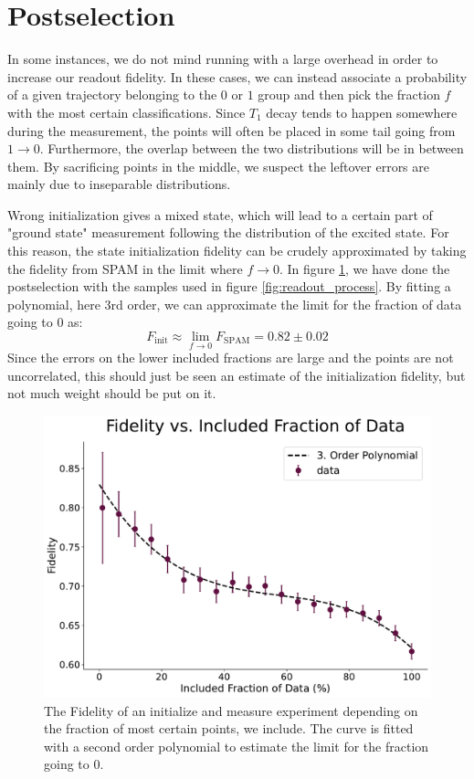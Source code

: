 \section{Postselection}\label{sec:postselection}
In some instances, we do not mind running with a large overhead in order to increase our readout fidelity. In these cases, we can instead associate a probability of a given trajectory belonging to the $0$ or $1$ group and then pick the fraction $f$ with the most certain classifications. Since $T_1$ decay tends to happen somewhere during the measurement, the points will often be placed in some tail going from $1 \to 0$. Furthermore, the overlap between the two distributions will be in between them. By sacrificing points in the middle, we suspect the leftover errors are mainly due to inseparable distributions. 

Wrong initialization gives a mixed state, which will lead to a certain part of "ground state" measurement following the distribution of the excited state. For this reason, the state initialization fidelity can be crudely approximated by taking the fidelity from SPAM in the limit where $f\to 0$. In figure \ref{fig:postselection_plot}, we have done the postselection with the samples used in figure \ref{fig:readout_process}. By fitting a polynomial, here 3rd order, we can approximate the limit for the fraction of data going to 0 as:
\begin{equation}
    F_{\text{init}} \approx \lim_{f \to 0} F_{\text{SPAM}} = 0.82 \pm 0.02
\end{equation}
Since the errors on the lower included fractions are large and the points are not uncorrelated, this should just be seen an estimate of the initialization fidelity, but  not much weight should be put on it. 


\begin{figure}[b]
    \centering
    \includegraphics[width = 0.70 \textwidth]{Readout/Figs/fidelity_vs_included_fraction.pdf}
    \caption{The Fidelity of an initialize and measure experiment depending on the fraction of most certain points, we include. The curve is fitted with a second order polynomial to estimate the limit for the fraction going to $0$.}
    \label{fig:postselection_plot}
\end{figure}

